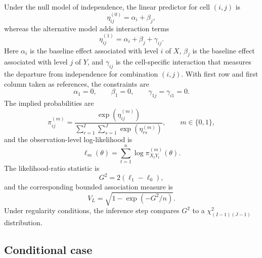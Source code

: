 \documentclass[11pt]{article}
\begin{document}
\begin{appendix}
Under the null model of independence, the linear predictor for cell $(i,j)$ is
\begin{equation}
\eta^{(0)}_{ij} = \alpha_i + \beta_j,
\label{eq:app-eta0}
\end{equation}
whereas the alternative model adds interaction terms
\begin{equation}
\eta^{(1)}_{ij} = \alpha_i + \beta_j + \gamma_{ij}.
\label{eq:app-eta1}
\end{equation}
Here $\alpha_i$ is the baseline effect associated with level $i$ of $X$,
$\beta_j$ is the baseline effect associated with level $j$ of $Y$, and
$\gamma_{ij}$ is the cell-specific interaction that measures the departure from
independence for combination $(i,j)$.
With first row and first column taken as references, the constraints are
\begin{equation}
\alpha_1 = 0,
\qquad
\beta_1 = 0,
\qquad
\gamma_{1j} = \gamma_{i1} = 0.
\label{eq:app-catcat-constraints}
\end{equation}
The implied probabilities are
\begin{equation}
\pi^{(m)}_{ij}
=
\frac{\exp(\eta^{(m)}_{ij})}
{\sum_{r=1}^{I}\sum_{s=1}^{J}\exp(\eta^{(m)}_{rs})},
\qquad m \in \{0,1\},
\label{eq:app-pi-uncond}
\end{equation}
and the observation-level log-likelihood is
\begin{equation}
\ell_m(\theta)
=
\sum_{t=1}^{n}\log \pi^{(m)}_{X_tY_t}(\theta).
\label{eq:app-loglik-uncond}
\end{equation}
The likelihood-ratio statistic is
\begin{equation}
G^2 = 2(\ell_1 - \ell_0),
\label{eq:app-g2-uncond}
\end{equation}
and the corresponding bounded association measure is
\begin{equation}
V_L = \sqrt{1 - \exp(-G^2/n)}.
\label{eq:app-vl-uncond}
\end{equation}
Under regularity conditions, the inference step compares $G^2$ to a
$\chi^2_{(I-1)(J-1)}$ distribution.

\subsection{Conditional case}


\end{appendix}
\end{document}
